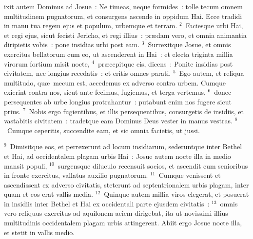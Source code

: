 \bchapter
{}ixit autem Dominus ad Josue~: Ne timeas, neque formides~: tolle tecum omnem multitudinem pugnatorum, et consurgens ascende in oppidum Hai. Ecce tradidi in manu tua regem ejus et populum, urbemque et terram.
${}^{2}$~Faciesque urbi Hai, et regi ejus, sicut fecisti Jericho, et regi illius~: pr\ae dam vero, et omnia animantia diripietis vobis~: pone insidias urbi post eam.
${}^{3}$~Surrexitque Josue, et omnis exercitus bellatorum cum eo, ut ascenderent in Hai~: et electa triginta millia virorum fortium misit nocte,
${}^{4}$~pr\ae cepitque eis, dicens~: Ponite insidias post civitatem, nec longius recedatis~: et eritis omnes parati.
${}^{5}$~Ego autem, et reliqua multitudo, qu\ae\ mecum est, accedemus ex adverso contra urbem. Cumque exierint contra nos, sicut ante fecimus, fugiemus, et terga vertemus,
${}^{6}$~donec persequentes ab urbe longius protrahantur~: putabunt enim nos fugere sicut prius.
${}^{7}$~Nobis ergo fugientibus, et illis persequentibus, consurgetis de insidiis, et vastabitis civitatem~: tradetque eam Dominus Deus vester in manus vestras.
${}^{8}$~Cumque ceperitis, succendite eam, et sic omnia facietis, ut jussi.


${}^{9}$~Dimisitque eos, et perrexerunt ad locum insidiarum, sederuntque inter Bethel et Hai, ad occidentalem plagam urbis Hai~: Josue autem nocte illa in medio mansit populi,
${}^{10}$~surgensque diluculo recensuit socios, et ascendit cum senioribus in fronte exercitus, vallatus auxilio pugnatorum.
${}^{11}$~Cumque venissent et ascendissent ex adverso civitatis, steterunt ad septentrionalem urbis plagam, inter quam et eos erat vallis media.
${}^{12}$~Quinque autem millia viros elegerat, et posuerat in insidiis inter Bethel et Hai ex occidentali parte ejusdem civitatis~:
${}^{13}$~omnis vero reliquus exercitus ad aquilonem aciem dirigebat, ita ut novissimi illius multitudinis occidentalem plagam urbis attingerent. Abiit ergo Josue nocte illa, et stetit in vallis medio.


